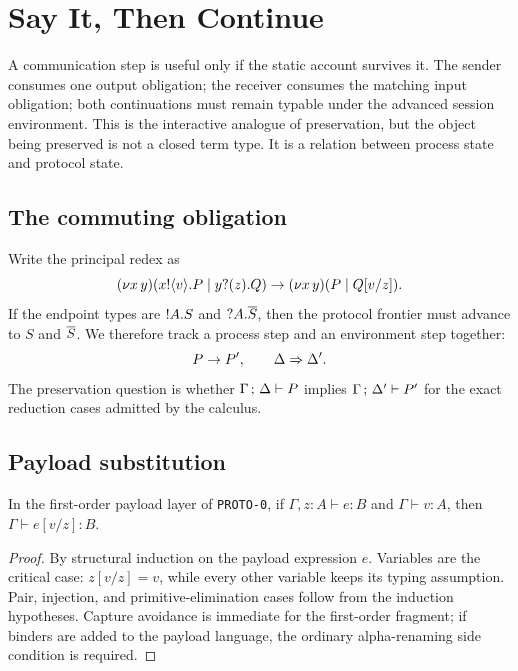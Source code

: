 \chapter{Say It, Then Continue}

A communication step is useful only if the static account survives it. The sender consumes one output obligation; the receiver consumes the matching input obligation; both continuations must remain typable under the advanced session environment. This is the interactive analogue of preservation, but the object being preserved is not a closed term type. It is a relation between process state and protocol state.

\section{The commuting obligation}
Write the principal redex as
\[
(\nu x\,y)(x!\langle v\rangle.P \mid y?(z).Q)
\to
(\nu x\,y)(P\mid Q[v/z]).
\]
If the endpoint types are $!A.S$ and $?A.\overline{S}$, then the protocol frontier must advance to $S$ and $\overline{S}$. We therefore track a process step and an environment step together:
\[
P\to P',\qquad \Delta\Rightarrow\Delta'.
\]
The preservation question is whether $\Gamma\,;\,\Delta \vdash P$ implies $\Gamma\,;\,\Delta' \vdash P'$ for the exact reduction cases admitted by the calculus.



\section{Payload substitution}
\begin{lemma}
In the first-order payload layer of \texttt{PROTO-0}, if $\Gamma,z:A\vdash e:B$ and $\Gamma\vdash v:A$, then $\Gamma\vdash e[v/z]:B$.
\end{lemma}
\begin{proof}
By structural induction on the payload expression $e$. Variables are the critical case: $z[v/z]=v$, while every other variable keeps its typing assumption. Pair, injection, and primitive-elimination cases follow from the induction hypotheses. Capture avoidance is immediate for the first-order fragment; if binders are added to the payload language, the ordinary alpha-renaming side condition is required.
\end{proof}

